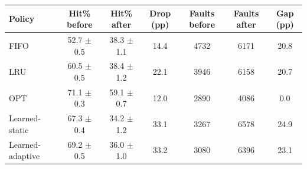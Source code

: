 \begin{tabular}{lcccccc}
\toprule
Policy & Hit\% before & Hit\% after & Drop (pp) & Faults before & Faults after & Gap (pp) \\
\midrule
FIFO & 52.7 $\pm$ 0.5 & 38.3 $\pm$ 1.1 & 14.4 & 4732 & 6171 & 20.8 \\
LRU & 60.5 $\pm$ 0.5 & 38.4 $\pm$ 1.2 & 22.1 & 3946 & 6158 & 20.7 \\
OPT & 71.1 $\pm$ 0.3 & 59.1 $\pm$ 0.7 & 12.0 & 2890 & 4086 & 0.0 \\
Learned-static & 67.3 $\pm$ 0.4 & 34.2 $\pm$ 1.2 & 33.1 & 3267 & 6578 & 24.9 \\
Learned-adaptive & 69.2 $\pm$ 0.5 & 36.0 $\pm$ 1.0 & 33.2 & 3080 & 6396 & 23.1 \\
\bottomrule
\end{tabular}
